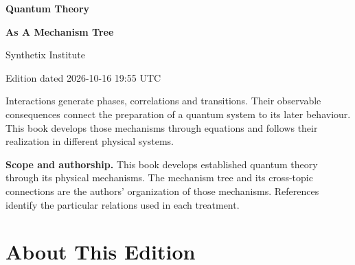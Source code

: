 \documentclass[11pt,oneside]{book}
\begin{document}
\frontmatter

\hypersetup{pageanchor=false}

\begin{titlepage}

\centering

\vspace*{1.7cm}

{\Huge\bfseries Quantum Theory\par}

\vspace{0.12cm}

{\Huge\bfseries As A Mechanism Tree\par}

\vspace{0.3cm}

\vspace{1.2cm}

{\large Synthetix Institute\par}

{\large Edition dated 2026-10-16 19:55 UTC\par}

\vfill

\begin{claimbox}

\noindent Interactions generate phases, correlations and transitions. Their observable consequences connect the preparation of a quantum system to its later behaviour. This book develops those mechanisms through equations and follows their realization in different physical systems.

\end{claimbox}

\vspace{0.5cm}

\begin{minipage}{0.94\linewidth}\small\raggedright

\textbf{Scope and authorship.} This book develops established quantum theory through its physical mechanisms. The mechanism tree and its cross-topic connections are the authors' organization of those mechanisms. References identify the particular relations used in each treatment.

\end{minipage}

\end{titlepage}

\hypersetup{pageanchor=true}

\tableofcontents

\chapter*{About This Edition}
\end{document}
